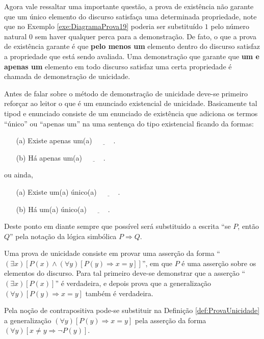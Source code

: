 Agora vale ressaltar uma importante questão, a prova de existência não garante que um único elemento do discurso satisfaça uma determinada propriedade, note que no Exemplo \ref{exe:DiagramaProva19} poderia ser substituído $1$ pelo número natural $0$ sem haver qualquer perca para a demonstração. De fato, o que a prova de existência garante é que \textbf{pelo menos um} elemento dentro do discurso satisfaz a propriedade que está sendo avaliada. Uma demonstração que garante que \textbf{um e apenas um} elemento em todo discurso satisfaz uma certa propriedade é chamada de demonstração de unicidade.

Antes de falar sobre o método de demonstração de unicidade deve-se primeiro reforçar ao leitor o que é um enunciado existencial de unicidade. Basicamente tal tipod e enunciado consiste de um enunciado de existência que adiciona os termos ``único'' ou ``apenas um'' na uma sentença do tipo existencial ficando da formas:
\begin{itemize}
	\item[(a)] Existe apenas um(a) $\underline{\ \ \ \ \ \ \ \ \ \ \ \ }$.
	\item[(b)] Há apenas um(a) $\underline{\ \ \ \ \ \ \ \ \ \ \ \ }$.
\end{itemize} 
ou ainda,
\begin{itemize}
	\item[(a)] Existe um(a) único(a) $\underline{\ \ \ \ \ \ \ \ \ \ \ \ }$.
	\item[(b)] Há  um(a) único(a) $\underline{\ \ \ \ \ \ \ \ \ \ \ \ }$.
\end{itemize} 

\begin{note}
	Deste ponto em diante sempre que possível será substituido a escrita ``se $P$, então $Q$'' pela notação da lógica simbólica $P \Rightarrow Q$.
\end{note}

\begin{definition}\label{def:ProvaUnicidade}
	Uma prova de unicidade consiste em provar uma asserção da forma ``$(\exists x)[P(x) \land (\forall y)[P(y) \Rightarrow x = y]]$'', em que $P$ é uma asserção sobre os elementos do discurso. Para tal primeiro deve-se demonstrar que a asserção ``$(\exists x)[P(x)]$'' é verdadeira, e depois prova que a generalização $(\forall y)[P(y) \Rightarrow x = y]$ também é verdadeira.
\end{definition}

\begin{remark}
	Pela noção de contrapositiva pode-se substituir na Definição \ref{def:ProvaUnicidade} a generalização $(\forall y)[P(y) \Rightarrow x = y]$ pela asserção da forma $(\forall y)[x \neq y \Rightarrow \neg P(y)]$.
\end{remark}

